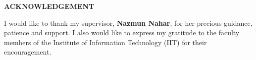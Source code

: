 \thispagestyle{empty} %

\begin{center}
	{\Large\bfseries ACKNOWLEDGEMENT}
\end{center}

I would like to thank my supervisor, \textbf{Nazmun Nahar}, for her precious guidance, patience and support. I also would like to express my gratitude to the faculty members of the Institute of Information Technology (IIT) for their encouragement.

\clearpage